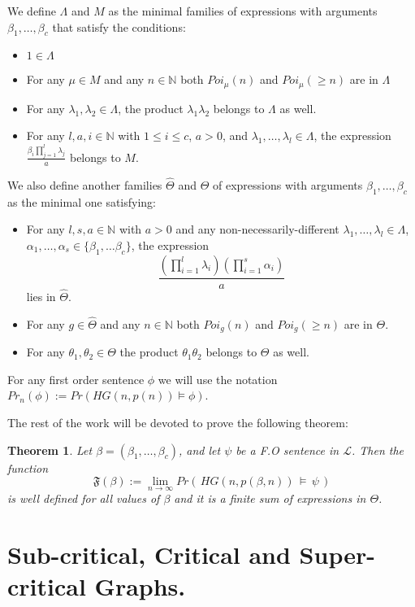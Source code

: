 \documentclass[11pt,notitlepage]{report}
\newtheorem{theorem}{Theorem}[chapter]
\theoremstyle{definition}
\newcommand{\N}{\mathbb{N}}
\newcommand{\Ln}{\lim\limits_{n\to \infty}}
\begin{document}
We define $\Lambda$ and $M$ as the minimal families
of expressions with arguments $\beta_1,\dots, \beta_c$ that satisfy the conditions:
\begin{itemize}
	\item $1\in \Lambda$
	\item For any $\mu\in M$ and any $n\in \N$ both
	$Poi_{\mu}(n)$ and $Poi_\mu(\geq n)$ are in $\Lambda$
	\item For any $\lambda_1,\lambda_2 \in \Lambda$, the
	product $\lambda_1\lambda_2$ belongs to $\Lambda$ as well.
	\item For any $l,a,i\in \N$ with $1\leq i \leq c$,
	$a > 0$, and $\lambda_1,\dots, \lambda_l\in \Lambda$,
	the expression $\frac{\beta_i \prod_{j=1}^{l}\lambda_j}{a}$
	belongs to $M$.		
\end{itemize}
We also define another families $\widehat{\Theta}$ and $\Theta$ of expressions with arguments
$\beta_1,\dots, \beta_c$ as the minimal one satisfying:
\begin{itemize}
	\item For any $l,s,a\in \N$ with $a>0$ and any 
	non-necessarily-different $\lambda_1,\dots, \lambda_l\in \Lambda$,
	$\alpha_1,\dots,\alpha_s\in \{\beta_1,\dots \beta_c\}$,
	the expression 
	\[\frac{\left(\prod_{i=1}^{l} \lambda_i \right)
		\left( \prod_{i=1}^{s}\alpha_i \right)}{a}\] 
	lies in $\widehat{\Theta}$.
	\item For any $g\in \widehat{\Theta}$ and any $n\in \N$ both
	$Poi_g(n)$ and $Poi_g(\geq n)$ are in $\Theta$.
	\item For any $\theta_1, \theta_2\in \Theta$ the product
	$\theta_1\theta_2$ belongs to $\Theta$ as well.
\end{itemize}


For any first order sentence $\phi$
we will use the notation 
$Pr_n(\phi):=Pr(HG(n,p(n))\models \phi)$. \par

The rest of the work will be devoted to prove the following theorem:

\begin{theorem}\label{thm:THEONE} 
	Let $\beta=(\beta_1,\dots, \beta_c)$, and let $\psi$ be a 
	F.O sentence in $\mathcal{L}$. Then the function
	\[
	\mathfrak{F}(\beta):=\Ln Pr(\, HG(n,p(\beta,n))\, \models \, \psi \,)
	\]
	is well defined for all values of $\beta$ and it is a finite sum 
	of expressions in $\Theta$.
\end{theorem}


\section{Sub-critical, Critical and Super-critical Graphs.}
\end{document}
